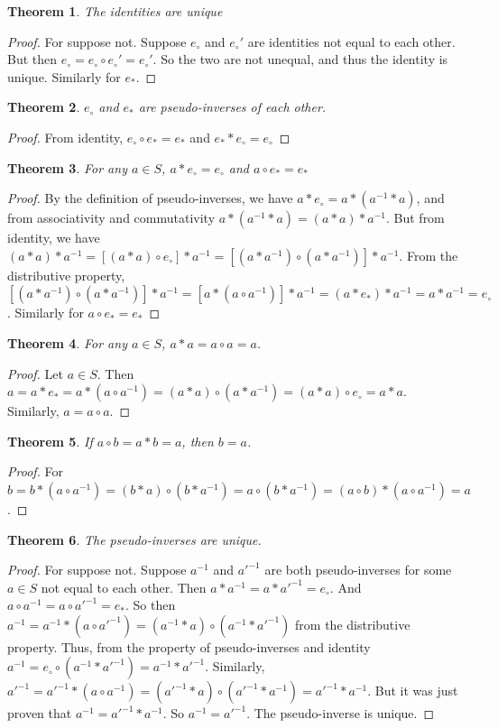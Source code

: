 \documentclass[oneside]{book}
\theoremstyle{mystyle}
\newtheorem{theorem}{Theorem}[section]
\begin{document}
\begin{theorem} The identities are unique
\end{theorem}
\begin{proof} For suppose not. Suppose $e_{\circ}$ and $e_{\circ}'$ are identities not equal to each other. But then $e_{\circ}=e_{\circ}\circ e_{\circ}'=e_{\circ}'$. So the two are not unequal, and thus the identity is unique. Similarly for $e_{*}$.
\end{proof}
\begin{theorem} $e_{\circ}$ and $e_{*}$ are pseudo-inverses of each other.
\end{theorem}
\begin{proof} From identity, $e_{\circ}\circ e_{*}=e_{*}$ and $e_{*}*e_{\circ}=e_{\circ}$
\end{proof}
\begin{theorem} For any $a\in S$, $a*e_{\circ}=e_{\circ}$ and $a\circ e_{*}=e_{*}$
\end{theorem}
\begin{proof} By the definition of pseudo-inverses, we have $a*e_{\circ}=a*(a^{-1}*a)$, and from associativity and commutativity $a*(a^{-1}*a)=(a*a)*a^{-1}$. But from identity, we have $(a*a)*a^{-1}=[(a*a)\circ e_{\circ}]*a^{-1}=[(a*a^{-1})\circ (a*a^{-1})]*a^{-1}$. From the distributive property, $[(a*a^{-1})\circ (a*a^{-1})]*a^{-1}=[a*(a\circ a^{-1})]*a^{-1}=(a*e_{*})*a^{-1}=a*a^{-1}=e_{\circ}$. Similarly for $a\circ e_{*}=e_{*}$
\end{proof}
\begin{theorem} For any $a\in S$, $a*a = a\circ a = a$.
\end{theorem}
\begin{proof} Let $a\in S$. Then $a=a*e_{*}=a*(a\circ a^{-1})=(a*a)\circ(a*a^{-1})=(a*a)\circ e_{\circ}=a*a$. Similarly, $a=a\circ a$.
\end{proof}
\begin{theorem} If $a\circ b = a*b = a$, then $b=a$. 
\end{theorem}
\begin{proof}
For $b = b*(a\circ a^{-1}) = (b*a)\circ(b* a^{-1})= a\circ (b* a^{-1}) = (a\circ b)*(a\circ a^{-1}) = a$.
\end{proof}
\begin{theorem} The pseudo-inverses are unique.
\end{theorem}
\begin{proof} For suppose not. Suppose $a^{-1}$ and $a'^{-1}$ are both pseudo-inverses for some $a\in S$ not equal to each other.  Then $a*a^{-1}=a* a'^{-1}=e_{\circ}$. And $a\circ a^{-1}=a\circ a'^{-1}=e_{*}$. So then $a^{-1}=a^{-1}*(a\circ a'^{-1})=(a^{-1}*a)\circ (a^{-1}*a'^{-1})$ from the distributive property. Thus, from the property of pseudo-inverses and identity $a^{-1}=e_{\circ}\circ (a^{-1}*a'^{-1})=a^{-1}*a'^{-1}$. Similarly, $a'^{-1}=a'^{-1}*(a\circ a^{-1})=(a'^{-1}*a)\circ (a'^{-1}*a^{-1})=a'^{-1}*a^{-1}$. But it was just proven that $a^{-1}=a'^{-1}*a^{-1}$. So $a^{-1}=a'^{-1}$. The pseudo-inverse is unique.
\end{proof}
\end{document}
